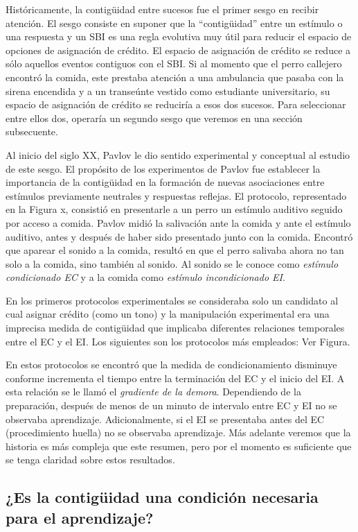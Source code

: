 \documentclass[
  letterpaper,
]{book}
\begin{document}
Históricamente, la contigüidad entre sucesos fue el primer sesgo en
recibir atención. El sesgo consiste en suponer que la ``contigüidad''
entre un estímulo o una respuesta y un SBI es una regla evolutiva muy
útil para reducir el espacio de opciones de asignación de crédito. El
espacio de asignación de crédito se reduce a sólo aquellos eventos
contiguos con el SBI. Si al momento que el perro callejero encontró la
comida, este prestaba atención a una ambulancia que pasaba con la sirena
encendida y a un transeúnte vestido como estudiante universitario, su
espacio de asignación de crédito se reduciría a esos dos sucesos. Para
seleccionar entre ellos dos, operaría un segundo sesgo que veremos en
una sección subsecuente.

Al inicio del siglo XX, Pavlov le dio sentido experimental y conceptual
al estudio de este sesgo. El propósito de los experimentos de Pavlov fue
establecer la importancia de la contigüidad en la formación de nuevas
asociaciones entre estímulos previamente neutrales y respuestas
reflejas. El protocolo, representado en la Figura x, consistió en
presentarle a un perro un estímulo auditivo seguido por acceso a comida.
Pavlov midió la salivación ante la comida y ante el estímulo auditivo,
antes y después de haber sido presentado junto con la comida. Encontró
que aparear el sonido a la comida, resultó en que el perro salivaba
ahora no tan solo a la comida, sino también al sonido. Al sonido se le
conoce como \emph{estímulo condicionado EC } y a la comida como
\emph{estímulo incondicionado EI}.

En los primeros protocolos experimentales se consideraba solo un
candidato al cual asignar crédito (como un tono) y la manipulación
experimental era una imprecisa medida de contigüidad que implicaba
diferentes relaciones temporales entre el EC y el EI. Los siguientes son
los protocolos más empleados: Ver Figura.

En estos protocolos se encontró que la medida de condicionamiento
disminuye conforme incrementa el tiempo entre la terminación del EC y el
inicio del EI. A esta relación se le llamó el \emph{gradiente de la
demora}. Dependiendo de la preparación, después de menos de un minuto de
intervalo entre EC y EI no se observaba aprendizaje. Adicionalmente, si
el EI se presentaba antes del EC (procedimiento huella) no se observaba
aprendizaje. Más adelante veremos que la historia es más compleja que
este resumen, pero por el momento es suficiente que se tenga claridad
sobre estos resultados.

\subsection{¿Es la contigüidad una condición necesaria para el
aprendizaje?}\label{es-la-contiguxfcidad-una-condiciuxf3n-necesaria-para-el-aprendizaje}
\end{document}
